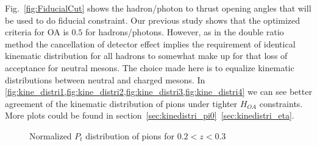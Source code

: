 Fig.~\ref{fig:FiducialCut} shows the hadron/photon to thrust opening angles that will be used to do fiducial constraint. Our previous study shows that the optimized criteria for OA is $0.5$ for hadrons/photons. However, as in the double ratio method the cancellation of detector effect implies the requirement of identical kinematic distribution for all hadrons to somewhat make up for that loss of acceptance for neutral mesons. The choice made here is to equalize kinematic distributions between neutral and charged mesons. In \cref{fig:kine_distri1,fig:kine_distri2,fig:kine_distri3,fig:kine_distri4} we can see better agreement of the kinematic distribution of pions under tighter $H_{OA}$ constraints. More plots could be found in section~\ref{sec:kinedistri_pi0}~\ref{sec:kinedistri_eta}.
\begin{figure}[H]
\captionsetup[subfloat]{farskip=2pt,captionskip=1pt}
\centering
{}
\caption{Normalized $P_t$ distribution of pions for $0.2<z<0.3$}
\label{fig:kine_distri1}
\end{figure}

